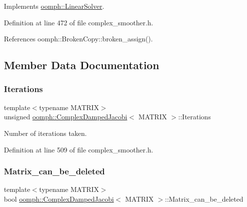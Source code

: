 Implements \hyperlink{classoomph_1_1LinearSolver_a15ce22542b74ed1826ea485edacbeb6e}{oomph\+::\+Linear\+Solver}.



Definition at line 472 of file complex\+\_\+smoother.\+h.



References oomph\+::\+Broken\+Copy\+::broken\+\_\+assign().



\subsection{Member Data Documentation}
\mbox{\label{classoomph_1_1ComplexDampedJacobi_af6c791c81e9600c9c4daa13ae3024dec}} 
\subsubsection{\texorpdfstring{Iterations}{Iterations}}
{\footnotesize\ttfamily template$<$typename M\+A\+T\+R\+IX$>$ \\
unsigned \hyperlink{classoomph_1_1ComplexDampedJacobi}{oomph\+::\+Complex\+Damped\+Jacobi}$<$ M\+A\+T\+R\+IX $>$\+::Iterations\hspace{0.3cm}{\ttfamily [private]}}



Number of iterations taken. 



Definition at line 509 of file complex\+\_\+smoother.\+h.

\mbox{\label{classoomph_1_1ComplexDampedJacobi_a36cb47a2cec4a979de7aa93ccc3dfc7f}} 
\subsubsection{\texorpdfstring{Matrix\+\_\+can\+\_\+be\+\_\+deleted}{Matrix\_can\_be\_deleted}}
{\footnotesize\ttfamily template$<$typename M\+A\+T\+R\+IX$>$ \\
bool \hyperlink{classoomph_1_1ComplexDampedJacobi}{oomph\+::\+Complex\+Damped\+Jacobi}$<$ M\+A\+T\+R\+IX $>$\+::Matrix\+\_\+can\+\_\+be\+\_\+deleted\hspace{0.3cm}{\ttfamily [private]}}



